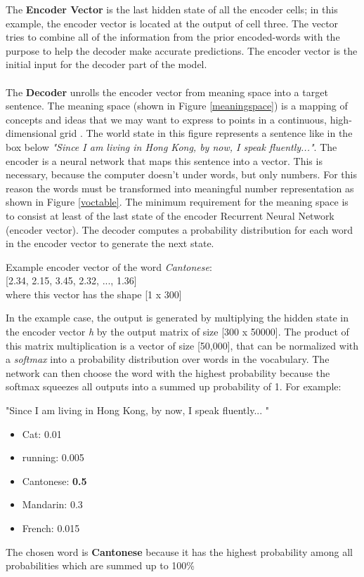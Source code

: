 The \textbf{Encoder Vector} is the last hidden state of all the encoder cells; in this example, the encoder vector is located at the output of cell three. The vector tries to combine all of the information from the prior encoded-words with the purpose to help the decoder make accurate predictions. The encoder vector is the initial input for the decoder part of the model. \\ \\
The \textbf{Decoder} unrolls the encoder vector from meaning space into a target sentence. The meaning space (shown in Figure \ref{meaningspace}) is a mapping of concepts and ideas that we may want to express to points in a continuous, high-dimensional grid \cite{mugan}. The world state in this figure represents a sentence like in the box below \textit{"Since I am living in Hong Kong, by now, I speak fluently..."}. The encoder is a neural network that maps this sentence into a vector. This is necessary, because the computer doesn't under words, but only numbers. For this reason the words must be transformed into meaningful number representation as shown in Figure \ref{voctable}.
The minimum requirement for the meaning space is to consist at least of the last state of the encoder Recurrent Neural Network (encoder vector). The decoder computes a probability distribution for each word in the encoder vector to generate the next state. 

\begin{tcolorbox}
	Example encoder vector of the word \textit{Cantonese}: \\
	
	[2.34, 2.15, 3.45, 2.32, ..., 1.36] \\
	
	where this vector has the shape [1 x 300]
\end{tcolorbox}

In the example case, the output is generated by multiplying the hidden state in the encoder vector \textit{h} by the output matrix of size [300 x 50000]. The product of this matrix multiplication is a vector of size [50,000], that can be normalized with a \textit{softmax} into a probability distribution over words in the vocabulary. The network can then choose the word with the highest probability because the softmax squeezes all outputs into a summed up probability of 1. For example:

\begin{tcolorbox}
	"Since I am living in Hong Kong, by now, I speak fluently... "
	
	\begin{itemize}
		\item Cat: 0.01
		\item running: 0.005
		\item Cantonese: \textbf{0.5}
		\item Mandarin: 0.3
		\item French: 0.015
	\end{itemize}
	
	The chosen word is \textbf{Cantonese} because it has the highest probability among all probabilities which are summed up to 100\%
\end{tcolorbox}
 

